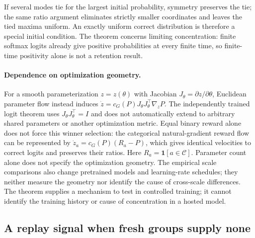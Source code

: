 \documentclass{article}
\newcommand{\1}{\mathbf 1}
\theoremstyle{remark}
\theoremstyle{definition}
\theoremstyle{plain}
\begin{document}
If several modes tie for the largest initial probability, symmetry preserves
the tie; the same ratio argument eliminates strictly smaller coordinates and
leaves the tied maxima uniform. An exactly uniform correct distribution is
therefore a special initial condition. The theorem concerns limiting
concentration: finite softmax logits already give positive probabilities at
every finite time, so finite-time positivity alone is not a retention result.

\paragraph{Dependence on optimization geometry.}
For a smooth parameterization $z=z(\theta)$ with Jacobian
$J_\theta=\partial z/\partial\theta$, Euclidean parameter flow instead
induces $\dot z=c_G(P)J_\theta J_\theta^\top\nabla_zP$. The independently
trained logit theorem uses $J_\theta J_\theta^\top=I$ and does not automatically
extend to arbitrary shared parameters or another optimization metric. Equal
binary reward alone does not force this winner selection: the categorical
natural-gradient reward flow can be represented by
$\dot z_a=c_G(P)(R_a-P)$, which gives identical velocities to correct logits
and preserves their ratios. Here $R_a=\1[a\in\mathcal C]$.
Parameter count alone does not specify the optimization geometry. The empirical
scale
comparisons also change pretrained models and learning-rate schedules; they
neither measure the geometry nor identify the cause of cross-scale differences.
The theorem supplies a mechanism to test in controlled training; it cannot
identify the training history or cause of concentration in a hosted model.

\subsection{A replay signal when fresh groups supply none}
\label{app:theory-gradient-availability}
\end{document}
